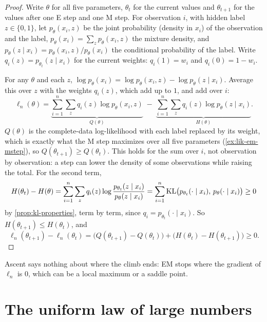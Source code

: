 
\begin{proof}
Write $\theta$ for all five parameters, $\theta_t$ for the current values and $\theta_{t+1}$ for the values after one E step and one M step.
For observation $i$, with hidden label $z \in \{0, 1\}$, let $p_\theta(x_i, z)$ be the joint probability (density in $x_i$) of the observation and the label, $p_\theta(x_i) = \sum_z p_\theta(x_i, z)$ the mixture density, and $p_\theta(z \mid x_i) = p_\theta(x_i, z)/p_\theta(x_i)$ the conditional probability of the label.
Write $q_i(z) = p_{\theta_t}(z \mid x_i)$ for the current weights: $q_i(1) = w_i$ and $q_i(0) = 1 - w_i$.

For any $\theta$ and each $z$, $\log p_\theta(x_i) = \log p_\theta(x_i, z) - \log p_\theta(z \mid x_i)$. Average this over $z$ with the weights $q_i(z)$, which add up to $1$, and add over $i$:
\[
\ell_n(\theta) = \underbrace{\sum_{i=1}^n\sum_z q_i(z)\log p_\theta(x_i, z)}_{Q(\theta)} \; - \; \underbrace{\sum_{i=1}^n\sum_z q_i(z)\log p_\theta(z \mid x_i)}_{H(\theta)}.
\]
$Q(\theta)$ is the complete-data log-likelihood with each label replaced by its weight, which is exactly what the M step maximizes over all five parameters (\cref{ex:lik-em-mstep}), so $Q(\theta_{t+1}) \geq Q(\theta_t)$.
This holds for the sum over $i$, not observation by observation: a step can lower the density of some observations while raising the total.
For the second term,
\[
H(\theta_t) - H(\theta) = \sum_{i=1}^n \sum_z q_i(z)\log\frac{p_{\theta_t}(z \mid x_i)}{p_\theta(z \mid x_i)} = \sum_{i=1}^n \mathrm{KL}\big(p_{\theta_t}(\cdot \mid x_i),\, p_\theta(\cdot \mid x_i)\big) \geq 0
\]
by \cref{prop:kl-properties}, term by term, since $q_i = p_{\theta_t}(\cdot \mid x_i)$.
So $H(\theta_{t+1}) \leq H(\theta_t)$, and
\[
\ell_n(\theta_{t+1}) - \ell_n(\theta_t) = \big(Q(\theta_{t+1}) - Q(\theta_t)\big) + \big(H(\theta_t) - H(\theta_{t+1})\big) \geq 0.
\]
\end{proof}

Ascent says nothing about where the climb ends: EM stops where the gradient of $\ell_n$ is $0$, which can be a local maximum or a saddle point.

\section{The uniform law of large numbers}
\label{sec:proof-ulln}

